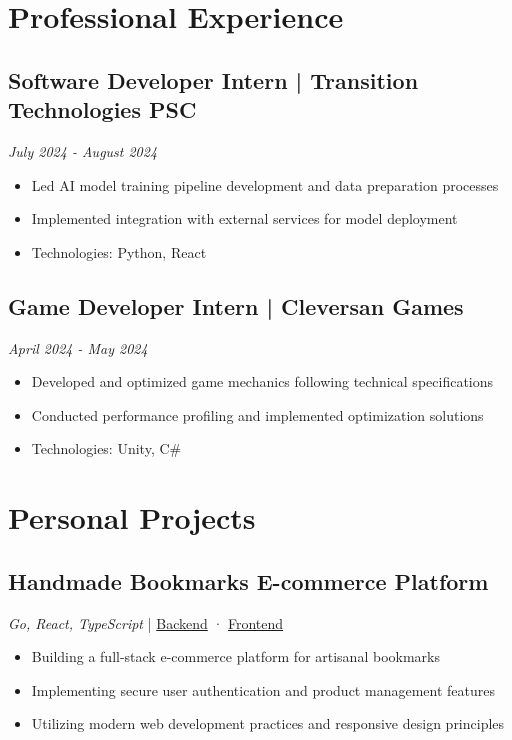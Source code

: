 \documentclass[a4paper,10pt]{article}
\begin{document}
\section{Professional Experience}

\subsection{Software Developer Intern | Transition Technologies PSC}
\textit{July 2024 - August 2024}
\begin{itemize}[leftmargin=0.5cm, nosep]
    \item Led AI model training pipeline development and data preparation processes
    \item Implemented integration with external services for model deployment
    \item Technologies: Python, React
\end{itemize}

\subsection{Game Developer Intern | Cleversan Games}
\textit{April 2024 - May 2024}
\begin{itemize}[leftmargin=0.5cm, nosep]
    \item Developed and optimized game mechanics following technical specifications
    \item Conducted performance profiling and implemented optimization solutions
    \item Technologies: Unity, C\#
\end{itemize}

\section{Personal Projects}

\subsection{Handmade Bookmarks E-commerce Platform}
\textit{Go, React, TypeScript} | \href{https://github.com/ZDSDD/zakladki}{Backend} · \href{https://github.com/ZDSDD/zakladki-front}{Frontend}
\begin{itemize}[leftmargin=0.5cm, nosep]
    \item Building a full-stack e-commerce platform for artisanal bookmarks
    \item Implementing secure user authentication and product management features
    \item Utilizing modern web development practices and responsive design principles
\end{itemize}
\end{document}
